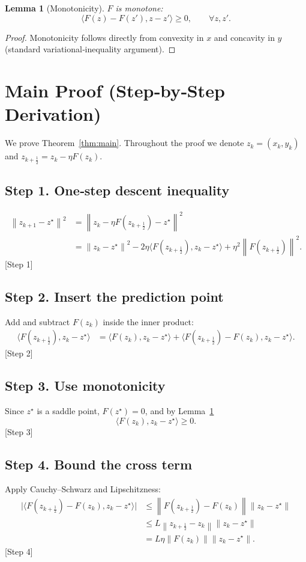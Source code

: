 \documentclass{article}
\newtheorem{lemma}{Lemma}
\newcommand{\norm}[1]{\left\lVert #1 \right\rVert}
\newcommand{\ip}[2]{\langle #1,#2\rangle}
\begin{document}
\begin{lemma}[Monotonicity]\label{lem:mono}
$F$ is monotone:
\[
\ip{F(z)-F(z')}{z-z'}\ge0,\qquad\forall z,z'.
\tag{L2}
\]
\end{lemma}
\begin{proof}
Monotonicity follows directly from convexity in $x$ and concavity in $y$ (standard variational‑inequality argument). \qedhere
\end{proof}

\section*{Main Proof (Step‑by‑Step Derivation)}
We prove Theorem~\ref{thm:main}. Throughout the proof we denote $z_k=(x_k,y_k)$ and $z_{k+\frac12}=z_k-\eta F(z_k)$.

\subsection*{Step 1. One‑step descent inequality}
\[
\begin{aligned}
\norm{z_{k+1}-z^\star}^{2}
&= \norm{z_k-\eta F(z_{k+\frac12})-z^\star}^{2}                                             \\
&= \norm{z_k-z^\star}^{2}
   -2\eta\ip{F(z_{k+\frac12})}{z_k-z^\star}
   +\eta^{2}\norm{F(z_{k+\frac12})}^{2}.               \tag{1}
\end{aligned}
\]
[Step 1]

\subsection*{Step 2. Insert the prediction point}
Add and subtract $F(z_k)$ inside the inner product:
\[
\begin{aligned}
\ip{F(z_{k+\frac12})}{z_k-z^\star}
&=\ip{F(z_{k})}{z_k-z^\star}
  +\ip{F(z_{k+\frac12})-F(z_k)}{z_k-z^\star}.         \tag{2}
\end{aligned}
\]
[Step 2]

\subsection*{Step 3. Use monotonicity}
Since $z^\star$ is a saddle point, $F(z^\star)=0$, and by Lemma~\ref{lem:mono}
\[
\ip{F(z_k)}{z_k-z^\star}\ge0.                         \tag{3}
\]
[Step 3]

\subsection*{Step 4. Bound the cross term}
Apply Cauchy–Schwarz and Lipschitzness:
\[
\begin{aligned}
\bigl|\ip{F(z_{k+\frac12})-F(z_k)}{z_k-z^\star}\bigr|
&\le \norm{F(z_{k+\frac12})-F(z_k)}\norm{z_k-z^\star}\\
&\le L\norm{z_{k+\frac12}-z_k}\norm{z_k-z^\star}                \tag{4}\\
&= L\eta\norm{F(z_k)}\norm{z_k-z^\star}.
\end{aligned}
\]
[Step 4]
\end{document}
